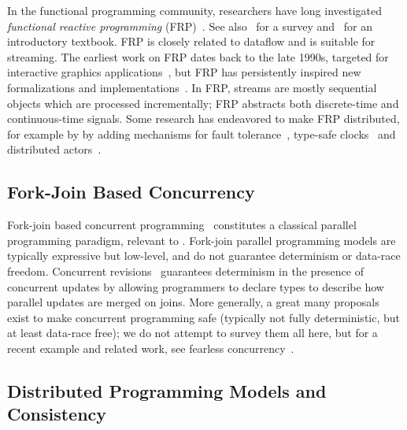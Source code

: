 In the functional programming community, researchers have long investigated
\emph{functional reactive programming} (FRP)~\cite{wan2000functional,nilsson2002functional}.
See also~\cite{bainomugisha2013survey} for a survey and~\cite{blackheath2016functional} for an introductory textbook.
FRP is closely related to dataflow and is suitable for streaming.
The earliest work on FRP dates back to the late 1990s, targeted for interactive graphics applications~\cite{elliott1997functional,elliott1997modeling},
but FRP has persistently inspired new formalizations and implementations~\cite{courtney2001frappe,cooper2006embedding,foster2011frenetic,perez2016functional}.
In FRP, streams are mostly sequential objects which are processed incrementally; FRP abstracts both discrete-time and continuous-time signals.
Some research has endeavored to make FRP distributed,
for example by by adding mechanisms for
fault tolerance~\cite{perez2020fault},
type-safe clocks~\cite{barenz2018rhine}
and distributed actors~\cite{shibanai2018distributed}.

\subsection{Fork-Join Based Concurrency}

Fork-join based
concurrent programming~\cite{frigo1998implementation,lea2000java}
constitutes a classical parallel programming paradigm,
relevant to .
Fork-join parallel programming models are typically expressive but low-level, and do not guarantee determinism or data-race freedom.
Concurrent revisions~\cite{burckhardt2010concurrent}
guarantees determinism in the presence of concurrent updates
by allowing programmers to declare types to describe how parallel updates are merged on joins.
More generally, a great many proposals exist to make concurrent programming safe (typically not fully deterministic, but at least data-race free);
we do not attempt to survey them all here,
but for a recent example and related work, see fearless concurrency~\cite{milano2022flexible}.

\subsection{Distributed Programming Models and Consistency}

